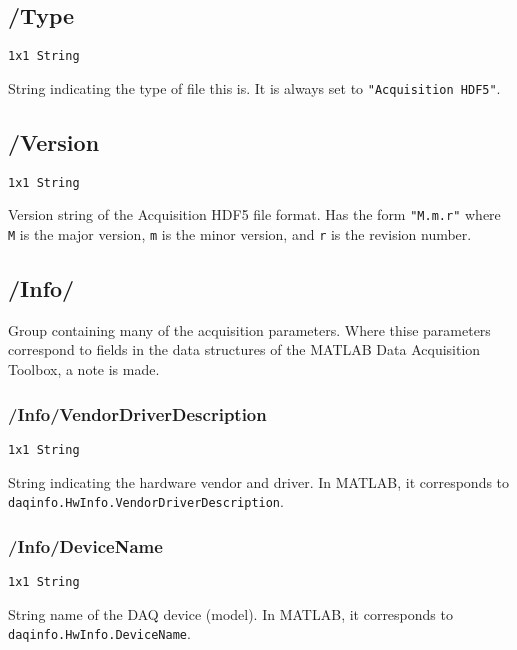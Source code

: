 \documentclass[12pt]{article} %
\begin{document}
\subsection{/Type}

\verb|1x1 String|

String indicating the type of file this is.
It is always set to \verb|"Acquisition HDF5"|.



\subsection{/Version}

\verb|1x1 String|

Version string of the Acquisition HDF5 file format.
Has the form \verb|"M.m.r"| where  \verb|M| is the major version, \verb|m| is the minor version, and \verb|r| is the revision number.



\subsection{/Info/}

Group containing many of the acquisition parameters.
Where thise parameters correspond to fields in the data structures of the MATLAB\textsuperscript{\textregistered} Data Acquisition Toolbox\textsuperscript{\texttrademark}, a note is made.



\subsubsection{/Info/VendorDriverDescription}

\verb|1x1 String|

String indicating the hardware vendor and driver.
In MATLAB\textsuperscript{\textregistered}, it corresponds to \\ \verb|daqinfo.HwInfo.VendorDriverDescription|.



\subsubsection{/Info/DeviceName}

\verb|1x1 String|

String name of the DAQ device (model).
In MATLAB\textsuperscript{\textregistered}, it corresponds to \newline \verb|daqinfo.HwInfo.DeviceName|.
\end{document}
